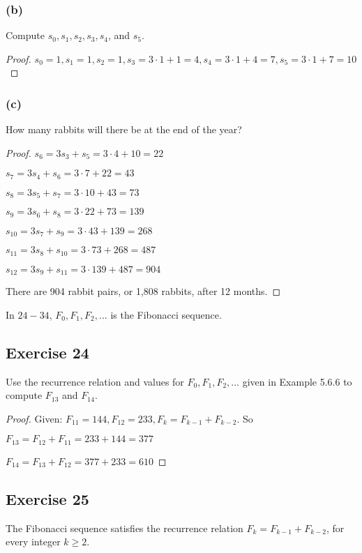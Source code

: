 \documentclass[14pt]{extarticle}
\newcommand{\cy}{\color{cyan}}
\begin{document}
\subsubsection{(b)}
Compute $s_0, s_1, s_2, s_3, s_4$, and $s_5$.

\begin{proof}
    $s_0 = 1, s_1 = 1, s_2 = 1, s_3 = 3 \cdot 1 + 1 = 4, s_4 = 3 \cdot 1 + 4 = 7, s_5 = 3 \cdot 1 + 7 = 10$
\end{proof}

\subsubsection{(c)}
How many rabbits will there be at the end of the year?

\begin{proof}
    $s_6 = 3s_3 + s_5 = 3 \cdot 4 + 10 = 22$

    $s_7 = 3s_4 + s_6 = 3 \cdot 7 + 22 = 43$

    $s_8 = 3s_5 + s_7 = 3 \cdot 10 + 43 = 73$

    $s_9 = 3s_6 + s_8 = 3 \cdot 22 + 73 = 139$

    $s_{10} = 3s_7 + s_9 = 3 \cdot 43 + 139 = 268$

    $s_{11} = 3s_8 + s_{10} = 3 \cdot 73 + 268 = 487$

    $s_{12} = 3s_9 + s_{11} = 3 \cdot 139 + 487 = 904$

    There are 904 rabbit pairs, or 1,808 rabbits, after 12 months.
\end{proof}

{\cy In $24-34$, $F_0, F_1, F_2, \ldots$ is the Fibonacci sequence.}

\subsection{Exercise 24}
Use the recurrence relation and values for $F_0, F_1, F_2, \ldots$ given in Example 5.6.6 to compute $F_{13}$ and $F_{14}$.

\begin{proof}
    Given: $F_{11} = 144, F_{12} = 233, F_k = F_{k-1} + F_{k-2}$. So

    $F_{13} = F_{12} + F_{11} = 233 + 144 = 377$

    $F_{14} = F_{13} + F_{12} = 377 + 233 = 610$
\end{proof}

\subsection{Exercise 25}
The Fibonacci sequence satisfies the recurrence relation $F_k = F_{k - 1} + F_{k - 2}$, for every integer $k \geq 2$.
\end{document}
